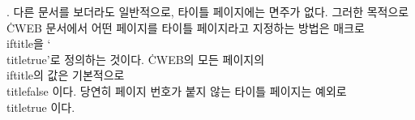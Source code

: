 {%
%
. 다른 문서를 보더라도 일반적으로, 타이틀 페이지에는 면주가
없다. 그러한 목적으로 \.{CWEB} 문서에서 어떤 페이지를 타이틀
페이지라고 지정하는 방법은   
매크로 \.{\\iftitle}을 `\.{\\titletrue}'로 정의하는 것이다.
\.{CWEB}의 모든 페이지의 \.{\\iftitle}의 값은
기본적으로 \.{\\titlefalse} 이다. 당연히 페이지 번호가 붙지 않는
타이틀 페이지는 예외로 \.{\\titletrue} 이다.

}
